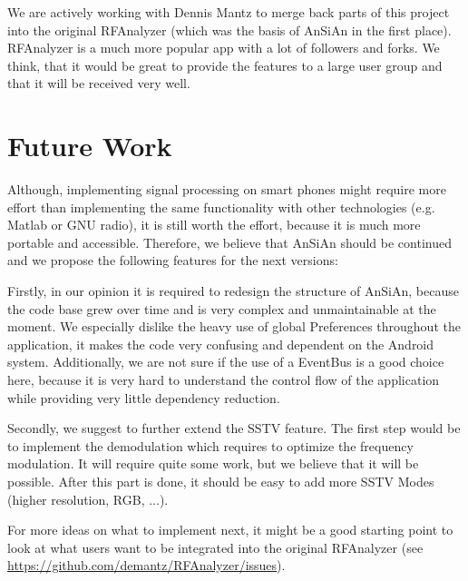 We are actively working with Dennis Mantz to merge back parts of this project into the original RFAnalyzer (which was the basis of AnSiAn in the first place). RFAnalyzer is a much more popular app with a lot of followers and forks. We think, that it would be great to provide the features to a large user group and that it will be received very well. 

\section{Future Work}

Although, implementing signal processing on smart phones might require more effort than implementing the same functionality with other technologies (e.g. Matlab or GNU radio), it is still worth the effort, because it is much more portable and accessible. Therefore, we believe that \ac{AnSiAn} should be continued and we propose the following features for the next versions:

Firstly, in our opinion it is required to redesign the structure of \ac{AnSiAn}, because the code base grew over time and is very complex and unmaintainable at the moment. We especially dislike the heavy use of global Preferences throughout the application, it makes the code very confusing and dependent on the Android system. Additionally, we are not sure if the use of a EventBus is a good choice here, because it is very hard to understand the control flow of the application while providing very little dependency reduction. 

Secondly, we suggest to further extend the SSTV feature. The first step would be to implement the demodulation which requires to optimize the frequency modulation. It will require quite some work, but we believe that it will be possible. After this part is done, it should be easy to add more SSTV Modes (higher resolution, RGB, ...). 

For more ideas on what to implement next, it might be a good starting point to look at what users want to be integrated into the original RFAnalyzer (see \url{https://github.com/demantz/RFAnalyzer/issues}). 


